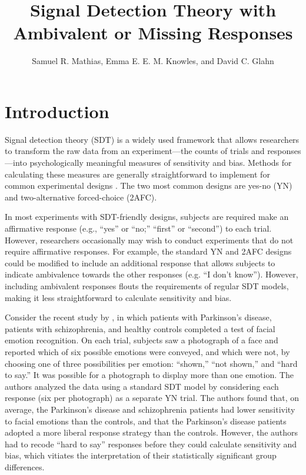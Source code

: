 \documentclass[man]{apa6}
\title{Signal Detection Theory with Ambivalent or Missing Responses}
\author{Samuel R. Mathias, Emma E. E. M. Knowles, and David C. Glahn}
\affiliation{Yale University}
\begin{document}
\maketitle

\section{Introduction}
Signal detection theory (SDT) is a widely used framework that allows researchers to transform the raw data from an experiment---the counts of trials and responses---into psychologically meaningful measures of sensitivity and bias. Methods for calculating these measures are generally straightforward to implement for common experimental designs \parencite[see][]{Green1966, Macmillan2005}. The two most common designs are yes-no (YN) and two-alternative forced-choice (2AFC).

In most experiments with SDT-friendly designs, subjects are required make an affirmative response (e.g., ``yes'' or ``no;'' ``first'' or ``second'') to each trial. However, researchers occasionally may wish to conduct experiments that do not require affirmative responses. For example, the standard YN and 2AFC designs could be modified to include an additional response that allows subjects to indicate ambivalence towards the other responses (e.g. ``I don't know''). However, including ambivalent responses flouts the requirements of regular SDT models, making it less straightforward to calculate sensitivity and bias.

Consider the recent study by \textcite{laskowskaemotional2015}, in which patients with Parkinson's disease, patients with schizophrenia, and healthy controls completed a test of facial emotion recognition. On each trial, subjects saw a photograph of a face and reported which of six possible emotions were conveyed, and which were not, by choosing one of three possibilities per emotion: ``shown,'' ``not shown,'' and ``hard to say.'' It was possible for a photograph to display more than one emotion. The authors analyzed the data using a standard SDT model by considering each response (six per photograph) as a separate YN trial. The authors found that, on average, the Parkinson's disease and schizophrenia patients had lower sensitivity to facial emotions than the controls, and that the Parkinson's disease patients adopted a more liberal response strategy than the controls. However, the authors had to recode ``hard to say'' responses before they could calculate sensitivity and bias, which vitiates the interpretation of their statistically significant group differences.
\end{document}
